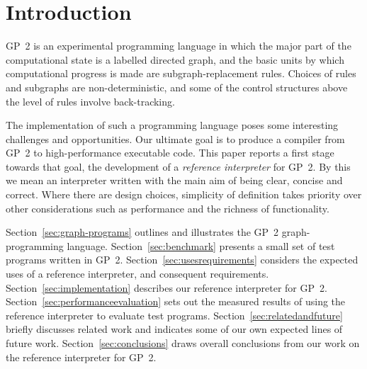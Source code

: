 \section{Introduction}

GP~2 is an experimental programming language in which the major part of
the computational state is a labelled directed graph, and the basic
units by which computational progress is made are subgraph-replacement
rules.
Choices of rules and subgraphs are non-deterministic, and some of
the control structures above the level of rules involve back-tracking.

The implementation of such a programming language poses some
interesting challenges and opportunities.
Our ultimate goal is to produce a compiler from GP~2 to
high-performance executable code.
This paper reports a first stage towards that goal, the development
of a \emph{reference interpreter} for GP~2.
By this we mean an interpreter written with the main aim of
being clear, concise and correct.
Where there are design choices, simplicity of
definition takes priority over other considerations
such as performance and the richness of functionality.

Section~\ref{sec:graph-programs} outlines and illustrates the GP~2
graph-programming language.
Section~\ref{sec:benchmark} presents a small set of test programs
written in GP~2.
Section~\ref{sec:usesrequirements} considers the expected uses of
a reference interpreter, and consequent requirements.
Section~\ref{sec:implementation} describes our reference interpreter for
GP~2.
Section~\ref{sec:performanceevaluation} sets out the measured results of using the reference
interpreter to evaluate test programs.
Section~\ref{sec:relatedandfuture} briefly discusses related work and
indicates some of our own expected lines of future work.
Section~\ref{sec:conclusions} draws overall conclusions from our work
on the reference interpreter for GP~2.

